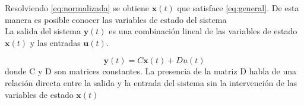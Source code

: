 \documentclass[10pt,a4paper]{article} %
\begin{document}
	Resolviendo \ref{eq:normalizada} se obtiene $\textbf{x}(t)$ que satisface \ref{eq:general}. De esta manera es posible conocer las variables de estado del sistema\\
	
	La salida del sistema $\textbf{y}(t)$ es una combinación lineal de las variables de estado $\textbf{x}(t)$ y las entradas $\textbf{u}(t)$. 

		\begin{equation}
	\textbf{y}(t)=C\textbf{x}(t)+Du(t)\label{eq:salida}
	\end{equation}
	donde C y D son matrices constantes. La presencia de la matriz D habla de una relación directa entre la salida y la entrada del sistema sin la intervención de las variables de estado $\textbf{x}(t)$
	
	

	
\end{document}
